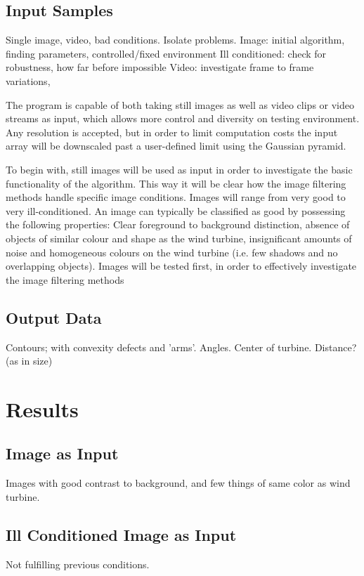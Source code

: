 \documentclass[a4paper,10pt]{article}
\begin{document}
  \subsection{Input Samples}
  Single image, video, bad conditions. Isolate problems.
  Image: initial algorithm, finding parameters, controlled/fixed environment
  Ill conditioned: check for robustness, how far before impossible
  Video: investigate frame to frame variations, 
  
  The program is capable of both taking still images as well as video clips or video streams as input,
  which allows more control and diversity on testing environment. Any resolution is accepted, but in
  order to limit computation costs the input array will be downscaled past a user-defined limit using
  the Gaussian pyramid.
  
  To begin with, still images will be used as input in order to investigate the basic functionality of the algorithm. This way it will be clear how the image filtering methods handle
  specific image conditions. Images will range from very good to very ill-conditioned. An image can
  typically be classified as good by possessing the following properties: Clear foreground to
  background distinction, absence of objects of similar colour and shape as the wind turbine,
  insignificant amounts of noise and homogeneous colours on the wind turbine (i.e. few shadows and
  no overlapping objects).
  Images will be tested first, in order to effectively investigate the image filtering methods 
  
  \subsection{Output Data}
  Contours; with convexity defects and 'arms'. Angles. Center of turbine. Distance? (as in size)
  
\section{Results}
  \subsection{Image as Input}
  Images with good contrast to background, and few things of same color as wind turbine.
  \subsection{Ill Conditioned Image as Input}
  Not fulfilling previous conditions.
\end{document}
